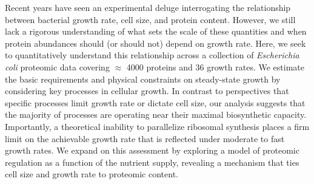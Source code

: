 
Recent years have seen an experimental deluge interrogating the relationship
between bacterial growth rate, cell size, and protein content. However, we still
lack a rigorous understanding of what sets the scale of these quantities and
when protein abundances should (or should not) depend on growth rate. Here, we
seek to quantitatively understand this relationship across a collection of
\textit{Escherichia coli} proteomic data covering $\approx$ 4000 proteins and 36
growth rates. We estimate the basic requirements and physical constraints on
steady-state growth by considering key processes in cellular growth. In contrast to
perspectives that specific processes limit growth rate or dictate cell size, our
analysis suggests that the majority of processes are operating near their
maximal biosynthetic capacity. Importantly, a theoretical inability to
parallelize ribosomal synthesis places a firm limit on the achievable growth rate
that is reflected under moderate to fast growth rates. We expand on this
assessment by exploring a model of proteomic regulation as a function of the
nutrient supply, revealing a mechanism that ties cell size and growth rate to
proteomic content.
